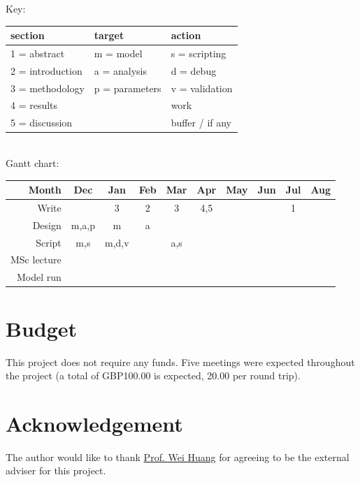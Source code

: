 \documentclass[a4paper, 11pt]{article}
\begin{document}
Key:
\begin{tabular}{lll}
	section & target & action\\\hline
	1 = abstract & m = model & s = scripting\\
	2 = introduction & a = analysis & d = debug\\
	3 = methodology & p = parameters & v = validation\\
	4 = results && \cellcolor{grey90}work\\
	5 = discussion && \cellcolor{lorange}buffer / if any\\
\end{tabular}\\
Gantt chart:
\begin{tabular}{r|ccccccccc}
	Month		&Dec						&Jan						&Feb					&Mar					&Apr					&May				&Jun					&Jul					&Aug				\\\hline
	Write		&							&\cellcolor{grey90}3		&\cellcolor{grey90}2	&\cellcolor{lorange}3	&\cellcolor{grey90}4,5	&\cellcolor{grey90}	&\cellcolor{grey90}		&\cellcolor{grey90}1	&\cellcolor{lorange}\\
	Design		&\cellcolor{grey90}m,a,p	&\cellcolor{grey90}m		&\cellcolor{grey90}a	&\cellcolor{lorange}	&						&					&						&						&					\\
	Script		&\cellcolor{grey90}m,s		&\cellcolor{grey90}m,d,v	&						&\cellcolor{grey90}a,s	&\cellcolor{grey90}		&\cellcolor{grey90}	&\cellcolor{lorange}	&						&					\\
	MSc lecture	&\cellcolor{lorange}		&\cellcolor{lorange}		&\cellcolor{lorange}	&\cellcolor{lorange}	&						&					&						&						&					\\
	Model run 	&							&\cellcolor{grey90}			&\cellcolor{grey90}		&\cellcolor{grey90}		&\cellcolor{grey90}		&\cellcolor{grey90}	&\cellcolor{lorange}	&\cellcolor{lorange}	&\cellcolor{lorange}\\
\end{tabular}
\section{Budget}
This project does not require any funds.  Five meetings were expected throughout the project (a total of GBP100.00 is expected, 20.00 per round trip).
\clearpage
\section*{Acknowledgement}
The author would like to thank \href{mailto:wei.huang@eng.ox.ac.uk}{Prof. Wei Huang} for agreeing to be the external adviser for this project.
\nocite{*}\printbibliography
\end{document}
